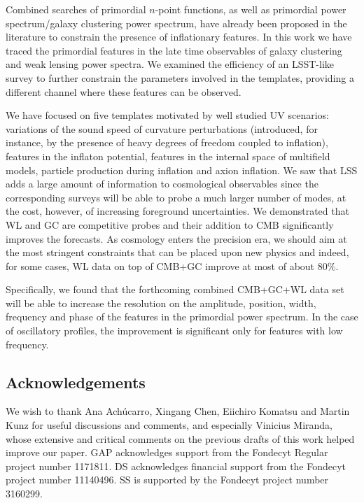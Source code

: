 \documentclass[12pt]{article}
\begin{document}
Combined searches of primordial $n$-point functions, as well as primordial power spectrum/galaxy clustering power spectrum, have already been proposed in the literature to constrain the presence of inflationary features. In this work we have traced the primordial features in the late time observables of galaxy clustering and weak lensing power spectra. We examined the efficiency of an LSST-like survey to further constrain the parameters involved in the templates, providing a different channel where these features can be observed. 

We have focused on five templates motivated by well studied UV scenarios: variations of the sound speed of curvature perturbations (introduced, for instance, by the presence of heavy degrees of freedom coupled to inflation), features in the inflaton potential, features in the internal space of multifield models, particle production during inflation and axion inflation.  
We saw that LSS adds a large amount of information to cosmological observables since the corresponding surveys will be able to probe a much larger number of modes, at the cost, however, of increasing foreground uncertainties. We demonstrated that WL and GC are competitive probes and their addition to CMB significantly improves the forecasts. As cosmology enters the precision era, we should aim at the most stringent constraints that can be placed upon new physics and indeed, for some cases, WL data on
top of CMB+GC improve at most of about $80\%$. 

Specifically, we found that the forthcoming combined CMB+GC+WL data set will be able to increase the resolution on the amplitude, position, width, frequency and phase of the features in the primordial power spectrum. In the case of oscillatory profiles, the improvement is significant only for features with low frequency. 



\subsection*{Acknowledgements}
We wish to thank Ana Ach\'ucarro, Xingang Chen, Eiichiro Komatsu and Martin Kunz for useful discussions and comments, and especially Vinicius Miranda, whose extensive and critical comments on the previous drafts of this work helped improve our paper. GAP acknowledges support from the Fondecyt Regular project number 1171811. DS acknowledges financial support from the Fondecyt project number 11140496. SS is supported by the Fondecyt project number 3160299.
\end{document}
